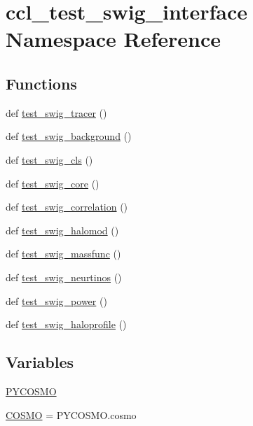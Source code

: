 \hypertarget{namespaceccl__test__swig__interface}{}\section{ccl\+\_\+test\+\_\+swig\+\_\+interface Namespace Reference}
\label{namespaceccl__test__swig__interface}
\subsection*{Functions}
\begin{DoxyCompactItemize}
\item 
def \mbox{\hyperlink{namespaceccl__test__swig__interface_a2aa841b1cc680b2bf85b712c9c1ad9aa}{test\+\_\+swig\+\_\+tracer}} ()
\item 
def \mbox{\hyperlink{namespaceccl__test__swig__interface_a0b9a0e9ddaaa7a37c01c289f200d9d63}{test\+\_\+swig\+\_\+background}} ()
\item 
def \mbox{\hyperlink{namespaceccl__test__swig__interface_ac0a01891ea854bac607860713979d767}{test\+\_\+swig\+\_\+cls}} ()
\item 
def \mbox{\hyperlink{namespaceccl__test__swig__interface_a896334ea462ebbdeb776f6e4bb92f581}{test\+\_\+swig\+\_\+core}} ()
\item 
def \mbox{\hyperlink{namespaceccl__test__swig__interface_a14c0226455a9c104e18098977d03bf6a}{test\+\_\+swig\+\_\+correlation}} ()
\item 
def \mbox{\hyperlink{namespaceccl__test__swig__interface_a8e2642dc39a7ea80575828fd9163cd11}{test\+\_\+swig\+\_\+halomod}} ()
\item 
def \mbox{\hyperlink{namespaceccl__test__swig__interface_a1211737259a7986dadf7e2ecb9d7c7e2}{test\+\_\+swig\+\_\+massfunc}} ()
\item 
def \mbox{\hyperlink{namespaceccl__test__swig__interface_a2c48b417c0fcc2e6db75bbfd02516841}{test\+\_\+swig\+\_\+neurtinos}} ()
\item 
def \mbox{\hyperlink{namespaceccl__test__swig__interface_a1bcdfd3c1b4ea96915fbdc8dc2960dec}{test\+\_\+swig\+\_\+power}} ()
\item 
def \mbox{\hyperlink{namespaceccl__test__swig__interface_a8ca66780453f11acb2308f761a0b6893}{test\+\_\+swig\+\_\+haloprofile}} ()
\end{DoxyCompactItemize}
\subsection*{Variables}
\begin{DoxyCompactItemize}
\item 
\mbox{\hyperlink{namespaceccl__test__swig__interface_abc24f5e95297d21e2f05fc865e056c99}{P\+Y\+C\+O\+S\+MO}}
\item 
\mbox{\hyperlink{namespaceccl__test__swig__interface_aa47ecf47fee76d3eba81a5d1a455beb0}{C\+O\+S\+MO}} = P\+Y\+C\+O\+S\+M\+O.\+cosmo
\end{DoxyCompactItemize}


